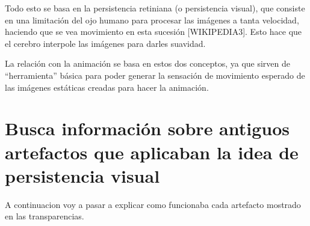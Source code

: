 \documentclass{article}
\begin{document}
\bigskip

Todo esto se basa en la persistencia retiniana (o persistencia visual), que consiste en una limitación del ojo humano para procesar las imágenes a tanta velocidad, haciendo que se vea movimiento en esta sucesión [WIKIPEDIA3]. Esto hace que el cerebro interpole las imágenes para darles suavidad.

\bigskip

La relación con la animación se basa en estos dos conceptos, ya que sirven de ``herramienta'' básica para poder generar la sensación de movimiento esperado de las imágenes estáticas creadas para hacer la animación. 


\section{Busca información sobre antiguos artefactos que aplicaban la idea de persistencia visual}

A continuacion voy a pasar a explicar como funcionaba cada artefacto mostrado en las transparencias.
\end{document}
